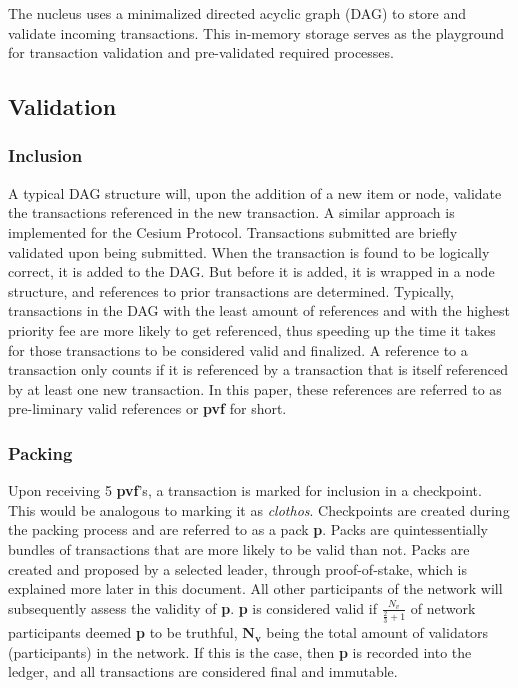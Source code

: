 \documentclass[letterpaper, 12pt]{article}
\begin{document}
The nucleus uses a minimalized directed acyclic graph (DAG) to store and validate incoming transactions. This in-memory storage serves as the playground for transaction validation and pre-validated required processes.

\subsection{Validation}

\subsubsection{Inclusion}

A typical DAG structure will, upon the addition of a new item or node, validate the transactions referenced in the new transaction. A similar approach is implemented for the Cesium Protocol. Transactions submitted are briefly validated upon being submitted. When the transaction is found to be logically correct, it is added to the DAG. But before it is added, it is wrapped in a node structure, and references to prior transactions are determined. Typically, transactions in the DAG with the least amount of references and with the highest priority fee are more likely to get referenced, thus speeding up the time it takes for those transactions to be considered valid and finalized. A reference to a transaction only counts if it is referenced by a transaction that is itself referenced by at least one new transaction. In this paper, these references are referred to as pre-liminary valid references or \textbf{pvf} for short.

\subsubsection{Packing}

Upon receiving 5 \textbf{pvf}’s, a transaction is marked for inclusion in a checkpoint. This would be analogous to marking it as \textit{clothos}. Checkpoints are created during the packing process and are referred to as a pack \textbf{p}. Packs are quintessentially bundles of transactions that are more likely to be valid than not. Packs are created and proposed by a selected leader, through proof-of-stake, which is explained more later in this document. All other participants of the network will subsequently assess the validity of \textbf{p}. \textbf{p} is considered valid if $\frac{N_v}{\frac{2}{3} + 1}$ of network participants deemed \textbf{p} to be truthful, $\mathbf{N_v}$ being the total amount of validators (participants) in the network. If this is the case, then \textbf{p} is recorded into the ledger, and all transactions are considered final and immutable.
\end{document}
